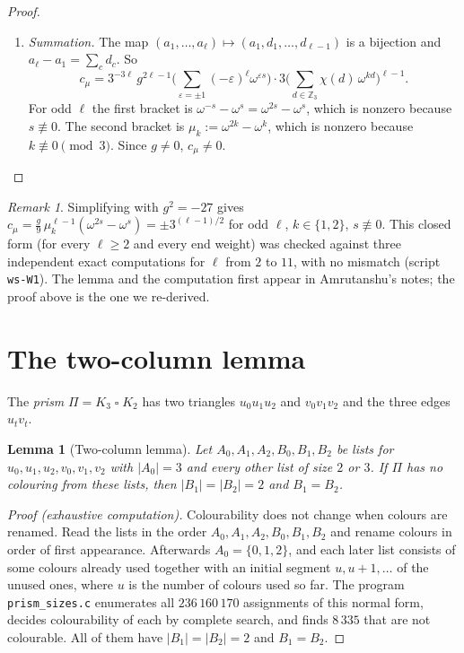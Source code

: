 \documentclass[11pt]{article}
\theoremstyle{plain}
\newtheorem{lemma}[theorem]{Lemma}
\theoremstyle{definition}
\theoremstyle{remark}
\newtheorem{remark}[theorem]{Remark}
\newcommand{\T}{\mathbin{\square}}
\newcommand{\Z}{\mathbb{Z}}
\newenvironment{steps}{\begin{enumerate}[label=(\arabic*),leftmargin=2.2em,itemsep=0.35em]}{\end{enumerate}}
\begin{document}
\begin{proof}
\begin{steps}
\item \emph{Summation.} The map $(a_1, \dots, a_\ell) \mapsto (a_1, d_1, \dots, d_{\ell-1})$ is a
bijection and $a_\ell - a_1 = \sum_c d_c$. So
\[
c_\mu = 3^{-3\ell}\, g^{2\ell - 1} \Big(\sum_{\varepsilon = \pm 1} (-\varepsilon)^{\ell}
\omega^{\varepsilon s}\Big) \cdot 3 \Big(\sum_{d \in \Z_3} \chi(d)\,\omega^{kd}\Big)^{\ell - 1}.
\]
For odd $\ell$ the first bracket is $\omega^{-s} - \omega^{s} = \omega^{2s} - \omega^{s}$, which is
nonzero because $s \not\equiv 0$. The second bracket is $\mu_k := \omega^{2k} - \omega^{k}$,
which is nonzero because $k \not\equiv 0 \pmod 3$. Since $g \ne 0$, $c_\mu \ne 0$. \qedhere
\end{steps}
\end{proof}

\begin{remark}
Simplifying with $g^2 = -27$ gives $c_\mu = \tfrac{g}{9}\, \mu_k^{\ell - 1}(\omega^{2s} -
\omega^{s}) = \pm 3^{(\ell-1)/2}$ for odd $\ell$, $k \in \{1,2\}$, $s \not\equiv 0$. This closed
form (for every $\ell \ge 2$ and every end weight) was checked against three independent exact
computations for $\ell$ from $2$ to $11$, with no mismatch (script \texttt{ws-W1}). The lemma and
the computation first appear in Amrutanshu's notes; the proof above is the one we re-derived.
\end{remark}

\section{The two-column lemma}\label{sec:prism}

The \emph{prism} $\Pi = K_3 \T K_2$ has two triangles $u_0u_1u_2$ and $v_0v_1v_2$ and the three
edges $u_tv_t$.

\begin{lemma}[Two-column lemma]\label{lem:prism}
Let $A_0, A_1, A_2, B_0, B_1, B_2$ be lists for $u_0, u_1, u_2, v_0, v_1, v_2$ with $|A_0| = 3$
and every other list of size $2$ or $3$. If $\Pi$ has no colouring from these lists, then
$|B_1| = |B_2| = 2$ and $B_1 = B_2$.
\end{lemma}

\begin{proof}[Proof (exhaustive computation)]
Colourability does not change when colours are renamed. Read the lists in the order $A_0, A_1,
A_2, B_0, B_1, B_2$ and rename colours in order of first appearance. Afterwards $A_0 = \{0, 1,
2\}$, and each later list consists of some colours already used together with an initial segment
$u, u+1, \dots$ of the unused ones, where $u$ is the number of colours used so far. The program
\texttt{prism\_sizes.c} enumerates all $236\,160\,170$ assignments of this normal form, decides
colourability of each by complete search, and finds $8\,335$ that are not colourable. All of them
have $|B_1| = |B_2| = 2$ and $B_1 = B_2$.
\end{proof}
\end{document}
